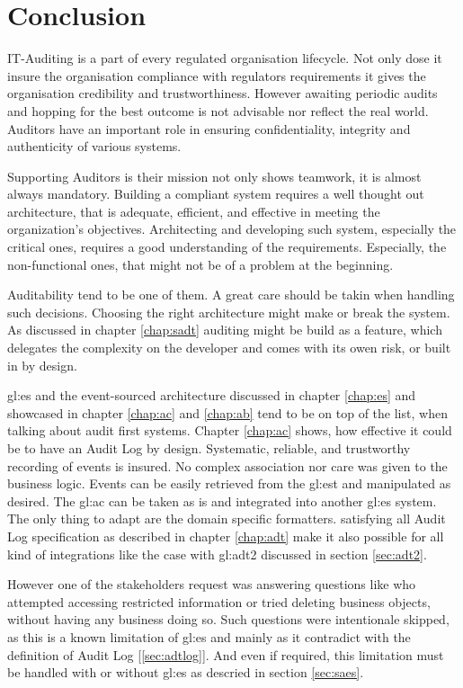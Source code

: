 %
\chapter{Conclusion}

IT-Auditing is a part of every regulated organisation lifecycle. Not only dose it insure the organisation compliance with regulators requirements it gives the organisation credibility and trustworthiness.  However awaiting periodic audits and hopping for the best outcome is not advisable nor reflect the real world. Auditors have an important role in ensuring confidentiality, integrity and authenticity of various systems.

Supporting Auditors is their mission not only shows teamwork, it is almost always mandatory. Building a compliant system requires a well thought out architecture, that is adequate, efficient, and effective in meeting the organization’s objectives. Architecting and developing such system, especially the critical ones, requires a good understanding of the requirements. Especially, the non-functional ones, that might not be of a problem at the beginning.

Auditability tend to be one of them. A great care should be takin when handling such decisions. Choosing the right architecture might make or break the system. As discussed in chapter \ref{chap:sadt} auditing might be build as a feature, which delegates the complexity on the developer and comes with its owen risk, or built in by design.

\gls{gl:es} and the event-sourced architecture discussed in chapter \ref{chap:es} and showcased in chapter \ref{chap:ac} and \ref{chap:ab} tend to be on top of the list, when talking about audit first systems. Chapter \ref{chap:ac} shows, how effective it could be to have an Audit Log by design. Systematic, reliable, and trustworthy recording of events is insured. No complex association nor care was given to the business logic. Events can be easily retrieved from the \gls{gl:est} and manipulated as desired. The \gls{gl:ac} can be taken as is and integrated into another \gls{gl:es} system. The only thing to adapt are the domain specific formatters. satisfying all Audit Log specification as described in chapter \ref{chap:adt} make it also possible for all kind of integrations like the case with \gls{gl:adt2} discussed in section \ref{sec:adt2}. 

However one of the stakeholders request was answering questions like who attempted accessing restricted information or tried deleting business objects, without having any business doing so. Such questions were intentionale skipped, as this is a known limitation of \gls{gl:es} and mainly as it contradict with the definition of Audit Log [\ref{sec:adtlog}]. And even if required, this limitation must be handled with or without \gls{gl:es} as descried in section \ref{sec:saes}.

